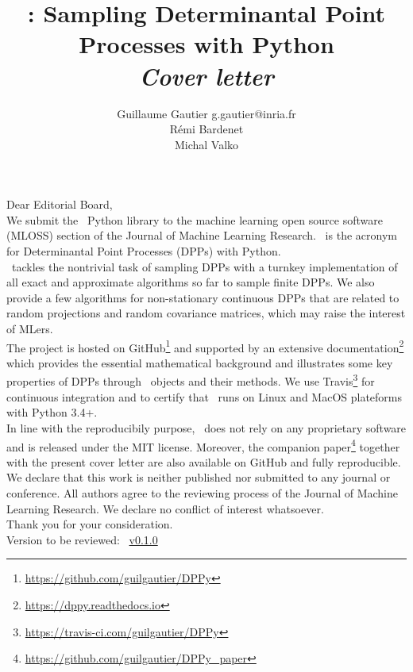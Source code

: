 \documentclass[twoside,11pt]{article}
\begin{document}
\title{\DPPy: Sampling Determinantal Point Processes with Python\\[5pt]
\textit{\normalsize Cover letter}}

\author{\name Guillaume Gautier \email g.gautier@inria.fr \\
       \name R\'emi Bardenet \\
       \name Michal Valko
}

\maketitle

\vspace{2em}

\setcounter{footnote}{3}

Dear Editorial Board,\\

We submit the \DPPy\ Python library to the machine learning open source software (MLOSS) section of the Journal of Machine Learning Research.
\DPPy\ is the acronym for Determinantal Point Processes (DPPs) with Python.\\

\DPPy\ tackles the nontrivial task of sampling DPPs with a turnkey implementation of all exact and approximate algorithms so far to sample finite DPPs.
We also provide a few algorithms for non-stationary continuous DPPs that are related to random projections and random covariance matrices, which may raise the interest of MLers.\\

The project is hosted on GitHub\footnote{\url{https://github.com/guilgautier/DPPy}} and supported by an extensive documentation\footnote{\url{https://dppy.readthedocs.io}} which provides the essential mathematical background and illustrates some key properties of DPPs through \DPPy\ objects and their methods.
We use Travis\footnote{\url{https://travis-ci.com/guilgautier/DPPy}} for continuous integration and to certify that \DPPy\ runs on Linux and MacOS plateforms with Python 3.4+.\\

In line with the reproducibily purpose, \DPPy\ does not rely on any proprietary software and is released under the MIT license.
Moreover, the companion paper\footnote{\url{https://github.com/guilgautier/DPPy_paper}} together with the present cover letter are also available on GitHub and fully reproducible.\\

We declare that this work is neither published nor submitted to any journal or conference.
All authors agree to the reviewing process of the Journal of Machine Learning Research.
We declare no conflict of interest whatsoever.\\

Thank you for your consideration.\\

Version to be reviewed: \DPPy\ \href{https://github.com/guilgautier/DPPy/tags}{v0.1.0}
\end{document}
